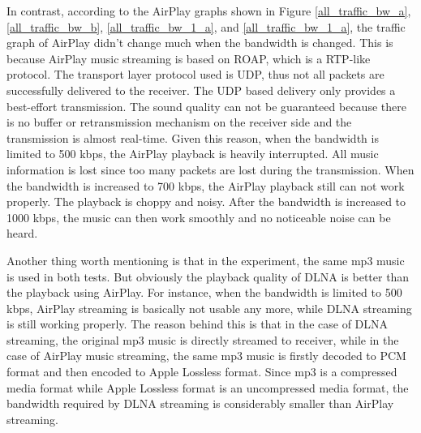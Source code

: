 In contrast, according to the AirPlay graphs shown in Figure
\ref{all_traffic_bw_a}, \ref{all_traffic_bw_b}, \ref{all_traffic_bw_1_a}, and
\ref{all_traffic_bw_1_a}, the traffic graph of AirPlay didn't change much
when the bandwidth is changed. This is because AirPlay music streaming is based
on ROAP, which is a RTP-like protocol. The transport layer protocol used is
UDP, thus not all packets are successfully delivered to the receiver. The UDP
based delivery only provides a best-effort transmission. The sound quality can
not be guaranteed because there is no buffer or retransmission mechanism on the
receiver side and the transmission is almost real-time. Given this reason, when
the bandwidth is limited to 500 kbps, the AirPlay playback is heavily
interrupted. All music information is lost since too many packets are lost
during the transmission. When the bandwidth is increased to 700 kbps, the
AirPlay playback still can not work properly. The playback is choppy and noisy.
After the bandwidth is increased to 1000 kbps, the music can then work smoothly
and no noticeable noise can be heard.

Another thing worth mentioning is that in the experiment, the same mp3 music is
used in both tests. But obviously the playback quality of DLNA is better than
the playback using AirPlay. For instance, when the bandwidth is limited to 500
kbps, AirPlay streaming is basically not usable any more, while DLNA streaming
is still working properly. The reason behind this is that in the case of DLNA
streaming, the original mp3 music is directly streamed to receiver, while in
the case of AirPlay music streaming, the same mp3 music is firstly decoded to
PCM format and then encoded to Apple Lossless format. Since mp3 is a compressed
media format while Apple Lossless format is an uncompressed media format, the
bandwidth required by DLNA streaming is considerably smaller than AirPlay
streaming.

